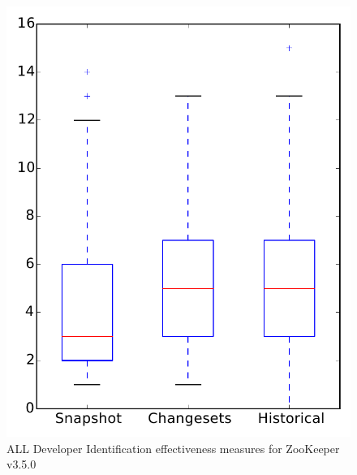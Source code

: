 
\begin{figure}
\centering
\includegraphics[height=0.4\textheight]{figures/dit/all_zookeeper}
\caption{ALL Developer Identification effectiveness measures for ZooKeeper v3.5.0}
\label{fig:dit:all:zookeeper}
\end{figure}
